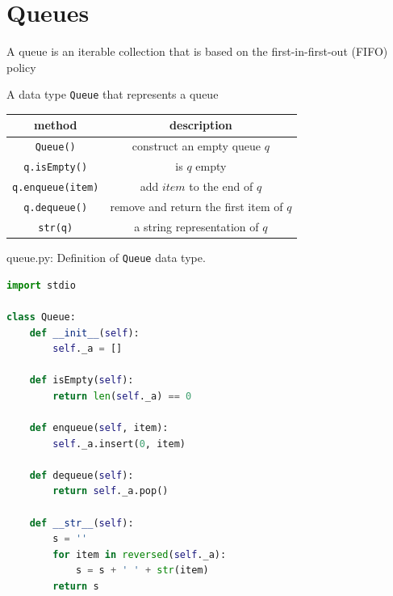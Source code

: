 \documentclass[8pt,a4paper,compress]{beamer}
\begin{document}
\section{Queues}

\begin{frame}[fragile]
\pause

A queue is an iterable collection that is based on the first-in-first-out (FIFO) policy

\pause
\bigskip

A data type \lstinline{Queue} that represents a queue
\begin{center}
\begin{tabular}{cc}
method & description \\ \hline
\lstinline$Queue()$ & construct an empty queue $q$ \\
\lstinline$q.isEmpty()$ & is $q$ empty \\
\lstinline$q.enqueue(item)$ & add $item$ to the end of $q$ \\
\lstinline$q.dequeue()$ &  remove and return the first item of $q$ \\
\lstinline$str(q)$ & a string representation of $q$
\end{tabular} 
\end{center}
\end{frame}

\begin{frame}[fragile]
\pause

\begin{framed}
\tiny queue.py: Definition of \lstinline{Queue} data type.
\end{framed}

\begin{lstlisting}[language=python,style=focusin]
import stdio

class Queue:
    def __init__(self):
        self._a = []

    def isEmpty(self):
        return len(self._a) == 0

    def enqueue(self, item):
        self._a.insert(0, item)

    def dequeue(self):
        return self._a.pop()

    def __str__(self):
        s = ''
        for item in reversed(self._a):
            s = s + ' ' + str(item)
        return s
\end{lstlisting}
\end{frame}
\end{document}
